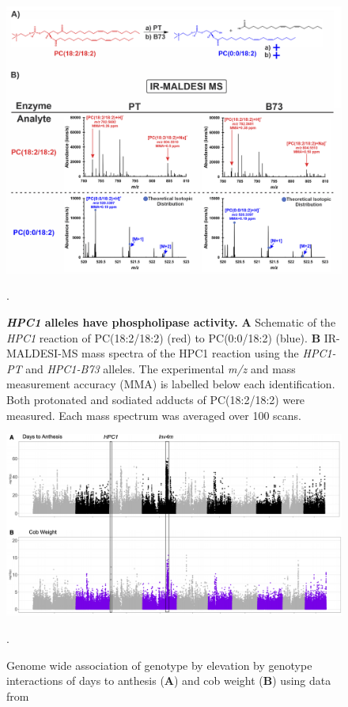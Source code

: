 \documentclass[9pt,twocolumn,twoside,lineno]{biorxiv}
\newcommand{\hpc}{\textit{HPC1}\xspace}
\begin{document}
\begin{figure}[t]
\begin{center}
\includegraphics[width=0.6 \paperwidth]{Sup_Figures/Sup_Fig_8.png}
\caption{\textbf{\hpc alleles have phospholipase activity.} \textbf{A} Schematic of the \hpc reaction of PC(18:2/18:2) (red) to
PC(0:0/18:2) (blue). 
\textbf{B} IR-MALDESI-MS mass spectra of the HPC1 reaction using the \textit{HPC1-PT} and \textit{HPC1-B73} alleles. The
experimental \textit{m/z} and mass measurement accuracy (MMA) is labelled below each
identification. Both protonated and sodiated adducts of PC(18:2/18:2) were measured. 
Each mass spectrum was averaged over 100 scans.}.
\label{figure:Sup:MS_spectra}
\end{center}
\end{figure} 

\clearpage

\begin{figure}[t]
\begin{center}
\includegraphics[width=0.8 \paperwidth]{Sup_Figures/Sup_Fig_9.png}
\caption{Genome wide association of genotype by elevation by genotype interactions of days to anthesis (\textbf{A}) and cob weight (\textbf{B}) using data from \cite{Gates2019-xu}}.
\label{figure:Sup:GxE_scan}
\end{center}
\end{figure} 
\end{document}
